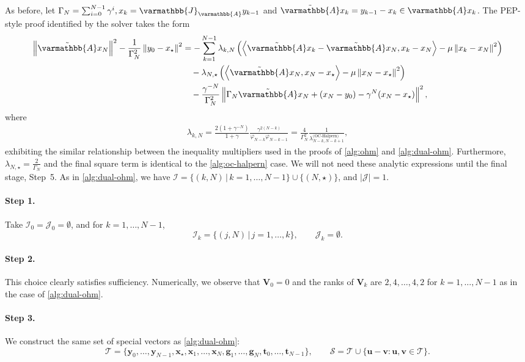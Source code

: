 \documentclass{article}
\theoremstyle{definition}
\theoremstyle{plain}
\newcommand{\vg}{{\mathbf{g}}}
\newcommand{\vt}{{\mathbf{t}}}
\newcommand{\vu}{{\mathbf{u}}}
\newcommand{\vv}{{\mathbf{v}}}
\newcommand{\vx}{{\mathbf{x}}}
\newcommand{\vy}{{\mathbf{y}}}
\newcommand{\vV}{{\mathbf{V}}}
\newcommand{\cI}{{\mathcal{I}}}
\newcommand{\cJ}{{\mathcal{J}}}
\newcommand{\cS}{{\mathcal{S}}}
\newcommand{\cT}{{\mathcal{T}}}
\newcommand{\opA}{{\varmathbb{A}}}
\newcommand{\opJ}{{\varmathbb{J}}}
\newcommand{\inprod}[2]{\left\langle #1,#2 \right\rangle}
\newcommand{\sqnorm}[1]{\left\| #1 \right\|^2}
\newcommand{\topa}{\tilde{\opA}}
\begin{document}
As before, let $\Gamma_N=\sum_{i=0}^{N-1}\gamma^i, x_k=\opJ_\opA y_{k-1}$ and $\topa x_k=y_{k-1}-x_k\in\opA x_k$.
The PEP-style proof identified by the solver takes the form
\begin{align*}
    \sqnorm{\topa x_N}-\frac{1}{\Gamma_N^2}\sqnorm{y_0-x_\star}
    &=
    -\sum_{k=1}^{N-1}\lambda_{k,N}
    \left(
    \inprod{\topa x_k-\topa x_N}{x_k-x_N}
    -\mu\sqnorm{x_k-x_N}
    \right) \notag\\
    &\quad
    -\lambda_{N,\star}
    \left(
    \inprod{\topa x_N}{x_N-x_\star}
    -\mu\sqnorm{x_N-x_\star}
    \right) \notag\\
    &\quad
    -\frac{\gamma^{-N}}{\Gamma_N^2}
    \sqnorm{\Gamma_N\topa x_N+(x_N-y_0)-\gamma^N(x_N-x_\star)},
\end{align*}
where
\begin{align}
\label{eqn:dual-oc-halpern-lambda-k-N}
    \lambda_{k,N} = \frac{2(1+\gamma^{-N})}{1+\gamma} \frac{\gamma^{2(N-k)}}{\varphi_{N-k}\varphi_{N-k-1}} = \frac{4}{\Gamma_N^2} \frac{1}{\lambda_{N-k,N-k+1}^{\text{(OC-Halpern)}}} ,
\end{align}
exhibiting the similar relationship between the inequality multipliers used in the proofs of \ref{alg:ohm} and \ref{alg:dual-ohm}.
Furthermore, $\lambda_{N,\star} = \frac{2}{\Gamma_N}$ and the final square term is identical to the \ref{alg:oc-halpern} case.
We will not need these analytic expressions until the final stage, Step~5.
As in \ref{alg:dual-ohm}, we have \(\cI=\{(k,N)\,|\,k=1,\dots,N-1\}\cup \{(N,\star)\}\), and $|\cJ| = 1$.

\paragraph{Step 1.}
Take \(\cI_0=\cJ_0=\emptyset\), and for \(k=1,\dots,N-1\),
\[
    \cI_k=\{(j,N)\,|\,j=1,\dots,k\},
    \qquad
    \cJ_k=\emptyset .
\]

\paragraph{Step 2.}
This choice clearly satisfies sufficiency. 
Numerically, we observe that \(\vV_0=0\) and the ranks of \(\vV_k\) are \(2,4,\dots,4,2\) for \(k=1,\dots,N-1\) as in the case of \ref{alg:dual-ohm}.

\paragraph{Step 3.}
We construct the same set of special vectors as \ref{alg:dual-ohm}:
\[
    \cT
    =
    \{\vy_0,\dots,\vy_{N-1},\vx_\star,\vx_1,\dots,\vx_N,\vg_1,\dots,\vg_N,\vt_0,\dots,\vt_{N-1}\},
    \qquad
    \cS=\cT\cup\{\vu-\vv:\vu,\vv\in\cT\} .
\]
\end{document}
